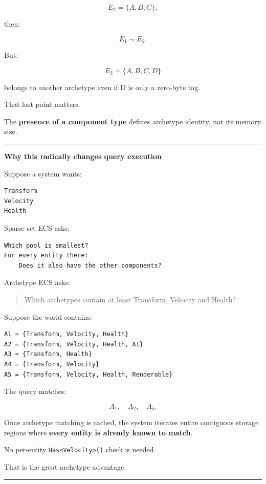 \[
E_2=\{A,B,C\},
\]

then:

\[
E_1\sim E_2.
\]

But:

\[
E_3=\{A,B,C,D\}
\]

belongs to another archetype even if D is only a zero-byte tag.

That last point matters.

The \textbf{presence of a component type} defines archetype identity, not its memory size.

\begin{center}\rule{0.5\linewidth}{0.5pt}\end{center}

\textbf{Why this radically changes query execution}

Suppose a system wants:

\begin{verbatim}
Transform
Velocity
Health
\end{verbatim}

Sparse-set ECS asks:

\begin{verbatim}
Which pool is smallest?
For every entity there:
    Does it also have the other components?
\end{verbatim}

Archetype ECS asks:

\begin{quote}
Which archetypes contain at least Transform, Velocity and Health?
\end{quote}

Suppose the world contains:

\begin{verbatim}
A1 = {Transform, Velocity, Health}
A2 = {Transform, Velocity, Health, AI}
A3 = {Transform, Health}
A4 = {Transform, Velocity}
A5 = {Transform, Velocity, Health, Renderable}
\end{verbatim}

The query matches:

\[
A_1,\quad A_2,\quad A_5.
\]

Once archetype matching is cached, the system iterates entire contiguous storage regions where \textbf{every entity is already known to match}.

No per-entity \texttt{Has\textless{}Velocity\textgreater{}()} check is needed.

That is the great archetype advantage.

\begin{center}\rule{0.5\linewidth}{0.5pt}\end{center}

